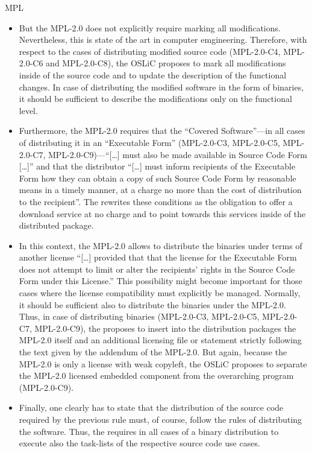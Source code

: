 \begin{license}{MPL}
\begin{itemize}
\item But the MPL-2.0 does not explicitly require marking all modifications.
  Nevertheless, this is state of the art in computer emgineering. Therefore,
  with respect to the cases of distributing modified source code (MPL-2.0-C4,
  MPL-2.0-C6 and MPL-2.0-C8), the OSLiC proposes to mark all modifications
  inside of the source code and to update the description of the functional
  changes. In case of distributing the modified software in the form of
  binaries, it should be sufficient to describe the modifications only on the
  functional level. 
  
\item Furthermore, the MPL-2.0 requires that the \enquote{Covered Software}---in 
  all cases of distributing it in an \enquote{Executable Form} (MPL-2.0-C3,
  MPL-2.0-C5, MPL-2.0-C7, MPL-2.0-C9)---\enquote{[\ldots] must also be made
  available in Source Code Form [\ldots]} and that the distributor
  \enquote{[\ldots] must inform recipients of the Executable Form how they can
  obtain a copy of such Source Code Form by reasonable means in a timely manner,
  at a charge no more than the cost of distribution to the
  recipient}.  The \oslic{} rewrites these conditions as the
  obligation to offer a download service at no charge and to point towards this
  services inside of the distributed package.
  
\item In this context, the MPL-2.0 allows to distribute the binaries under terms
  of another license \enquote{[\ldots] provided that that the license for the
  Executable Form does not attempt to limit or alter the recipients’ rights in
  the Source Code Form under this License.} This possibility
  might become important for those cases where the license compatibility must
  explicitly be managed. Normally, it should be sufficient also to distribute
  the binaries under the MPL-2.0. Thus, in case of distributing binaries
  (MPL-2.0-C3, MPL-2.0-C5, MPL-2.0-C7, MPL-2.0-C9), the \oslic{} proposes to
  insert into the distribution packages the MPL-2.0 itself and an additional
  licensing file or statement strictly following the text given by the addendum
  of the MPL-2.0. But again, because the MPL-2.0 is only a
  license with weak copyleft, the OSLiC proposes to separate the MPL-2.0
  licensed embedded component from the overarching program (MPL-2.0-C9).
  
\item Finally, one clearly has to state that the distribution of the source code
  required by the previous rule must, of course, follow the rules of distributing
  the software. Thus, the \oslic{} requires in all cases of a binary distribution
  to execute also the task-lists of the respective source code use cases.

\end{itemize}


\end{license}
%

